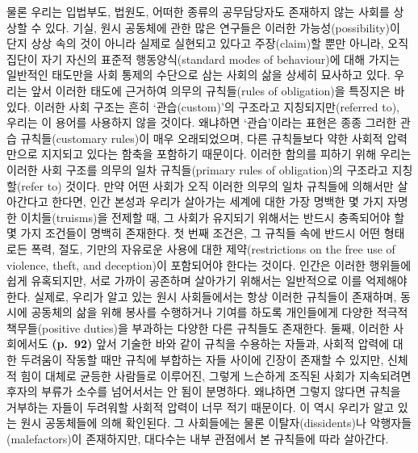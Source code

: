 물론 우리는 입법부도, 법원도, 어떠한 종류의 공무담당자도 존재하지 않는
사회를 상상할 수 있다. 기실, 원시 공동체에 관한 많은 연구들은 이러한
가능성(possibility)이 단지 상상 속의 것이 아니라 실제로 실현되고 있다고
주장(claim)할 뿐만 아니라, 오직 집단이 자기 자신의 표준적
행동양식(standard modes of behaviour)에 대해 가지는 일반적인 태도만을
사회 통제의 수단으로 삼는 사회의 삶을 상세히 묘사하고 있다. 우리는 앞서
이러한 태도에 근거하여 의무의 규칙들(rules of obligation)을 특징지은 바
있다. 이러한 사회 구조는 흔히 ‘관습(custom)’의 구조라고
지칭되지만(referred to), 우리는 이 용어를 사용하지 않을 것이다. 왜냐하면
‘관습’이라는 표현은 종종 그러한 관습 규칙들(customary rules)이 매우
오래되었으며, 다른 규칙들보다 약한 사회적 압력만으로 지지되고 있다는
함축을 포함하기 때문이다. 이러한 함의를 피하기 위해 우리는 이러한 사회
구조를 의무의 일차 규칙들(primary rules of obligation)의 구조라고
지칭할(refer to) 것이다. 만약 어떤 사회가 오직 이러한 의무의 일차
규칙들에 의해서만 살아간다고 한다면, 인간 본성과 우리가 살아가는 세계에
대한 가장 명백한 몇 가지 자명한 이치들(truisms)을 전제할 때, 그 사회가
유지되기 위해서는 반드시 충족되어야 할 몇 가지 조건들이 명백히 존재한다.
첫 번째 조건은, 그 규칙들 속에 반드시 어떤 형태로든 폭력, 절도, 기만의
자유로운 사용에 대한 제약(restrictions on the free use of violence,
theft, and deception)이 포함되어야 한다는 것이다. 인간은 이러한 행위들에
쉽게 유혹되지만, 서로 가까이 공존하며 살아가기 위해서는 일반적으로 이를
억제해야 한다. 실제로, 우리가 알고 있는 원시 사회들에서는 항상 이러한
규칙들이 존재하며, 동시에 공동체의 삶을 위해 봉사를 수행하거나 기여를
하도록 개인들에게 다양한 적극적 책무들(positive duties)을 부과하는
다양한 다른 규칙들도 존재한다. 둘째, 이러한 사회에서도 \textbf{(p.~92)}
앞서 기술한 바와 같이 규칙을 수용하는 자들과, 사회적 압력에 대한
두려움이 작동할 때만 규칙에 부합하는 자들 사이에 긴장이 존재할 수
있지만, 신체적 힘이 대체로 균등한 사람들로 이루어진, 그렇게 느슨하게
조직된 사회가 지속되려면 후자의 부류가 소수를 넘어서서는 안 됨이
분명하다. 왜냐하면 그렇지 않다면 규칙을 거부하는 자들이 두려워할 사회적
압력이 너무 적기 때문이다. 이 역시 우리가 알고 있는 원시 공동체들에 의해
확인된다. 그 사회들에는 물론 이탈자(dissidents)나
악행자들(malefactors)이 존재하지만, 대다수는 내부 관점에서 본 규칙들에
따라 살아간다.

